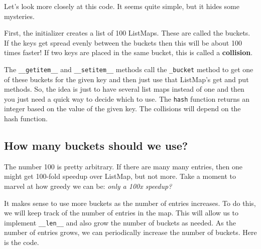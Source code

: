 Let's look more closely at this code.  It seems quite simple, but it hides some mysteries.


First, the initializer creates a list of 100 ListMaps.  These are called the buckets. If the keys get spread evenly between the buckets then this will be about 100 times faster!  If two keys are placed in the same bucket, this is called a \textbf{collision}.


The \texttt{\_\_getitem\_\_} and \texttt{\_\_setitem\_\_} methods call the \texttt{\_bucket} method to get one of these buckets for the given key and then just use that ListMap's get and put methods.  So, the idea is just to have several list maps instead of one and then you just need a quick way to decide which to use.  The \texttt{hash} function returns an integer based on the value of the given key.  The collisions will depend on the hash function.

\subsection{How many buckets should we use?}


The number 100 is pretty arbitrary.  If there are many many entries, then one might get 100-fold speedup over ListMap, but not more.  Take a moment to marvel at how greedy we can be: \emph{only a 100x speedup?}


It makes sense to use more buckets as the number of entries increases.  To do this, we will keep track of the number of entries in the map.  This will allow us to implement \texttt{\_\_len\_\_} and also grow the number of buckets as needed.  As the number of entries grows, we can periodically increase the number of buckets.  Here is the code.

